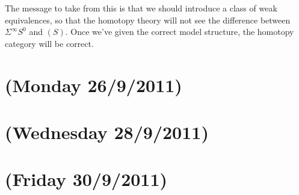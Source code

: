 \documentclass[11pt]{article}
\newcommand{\NewLecture}[3]{\section{#1 {\small(#2/#3/2011)}}}
\begin{document}
The message to take from this is that we should introduce a class of weak equivalences, so that the homotopy theory will not see the difference between $\Sigma^\infty S^0$ and $(S)$. Once we've given the correct model structure, the homotopy category will be correct.
\NewLecture{}{Monday 26}{9}
\NewLecture{}{Wednesday 28}{9}
\NewLecture{}{Friday 30}{9}
\end{document}

